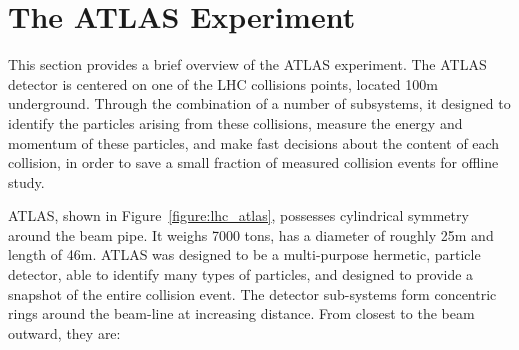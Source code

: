 \section{The ATLAS Experiment}

This section provides a brief overview of the ATLAS experiment. The ATLAS detector
is centered on one of the LHC collisions points, located 100m underground. Through
the combination of a number of subsystems, it designed to identify the 
particles arising from these collisions, measure the energy and momentum  
of these particles, and make fast decisions about the content
of each collision, in order to save a small fraction of measured collision events
for offline study. 

ATLAS, shown in Figure~\ref{figure:lhc_atlas},  possesses cylindrical symmetry around the beam pipe. It weighs 7000 tons,
has a diameter of roughly 25m and length of 46m. ATLAS was designed to be a multi-purpose
hermetic, particle detector, able to identify many types of particles, and designed to provide
a snapshot of the entire collision event. The detector sub-systems form concentric rings 
around the beam-line at increasing distance. From closest to the beam outward, they are:

